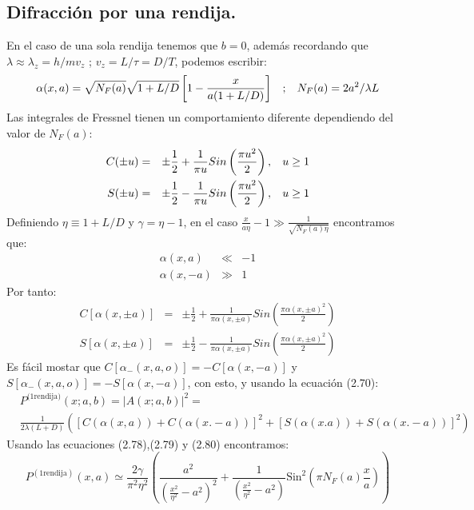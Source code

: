 \subsection{Difracción por una rendija.}
En el caso de una sola rendija tenemos que $b=0$, además recordando que $\lambda\approx\lambda_z=h/mv_z$ ; $v_z=L/\tau=D/T$, podemos escribir:
\begin{equation}
\alpha(x,a)=\sqrt{N_F(a)}\sqrt{1+L/D}\left[	1-\frac{x}{a(1+L/D)}\right] \hspace{0.3cm};\hspace{0.3cm} N_F(a)=2a^2/\lambda L
\end{equation}
Las integrales de Fressnel tienen un comportamiento diferente dependiendo del valor de $N_F(a)$:
\begin{eqnarray}
C(\pm u)&=&\pm\frac{1}{2}+\frac{1}{\pi u}Sin\left(\frac{\pi u^2}{2}\right),\hspace{0.3cm}u\geq 1\\
S(\pm u)&=&\pm\frac{1}{2}-\frac{1}{\pi u}Sin\left(\frac{\pi u^2}{2}\right),\hspace{0.3cm}u\geq 1
\end{eqnarray}
Definiendo $\eta\equiv 1+L/D$ y $\gamma=\eta-1$, en el caso $\frac{x}{a\eta}-1\gg\frac{1}{\sqrt{N_F(a)\eta}}$ encontramos que:
\begin{eqnarray}
\alpha(x,a)&\ll&-1\\
\alpha(x,-a)&\gg&1
\end{eqnarray} 
Por tanto:
\begin{eqnarray}
C[\alpha(x,\pm a)]&=&\pm\frac{1}{2}+\frac{1}{\pi\alpha(x,\pm a) }Sin\left(\frac{\pi \alpha(x,\pm a)^2}{2}\right)\\
S[\alpha(x,\pm a)]&=&\pm\frac{1}{2}-\frac{1}{\pi\alpha(x,\pm a) }Sin\left(\frac{\pi \alpha(x,\pm a)^2}{2}\right)
\end{eqnarray}
Es fácil mostar que $C[\alpha_-(x,a,o)]=-C[\alpha(x,-a)]$ y $S[\alpha_-(x,a,o)]=-S[\alpha(x,-a)]$, con esto, y usando la ecuación (2.70):
\begin{eqnarray}
\nonumber & P^{\text{(1rendija)}}(x;a,b)=|A(x;a,b)|^2=\\&\frac{1}{2\lambda(L+D)}
([C(\alpha(x,a))+C(\alpha(x.-a))]^{2}+[S(\alpha(x.a))+S(\alpha(x.-a))]^{2})
\end{eqnarray}
Usando las ecuaciones (2.78),(2.79) y (2.80) encontramos:
\begin{equation}
P^{(\text{1rendija})}(x,a)\simeq\frac{2\gamma}{\pi^{2}\eta^{2}}\left(\frac{a^{2}}{\left(\frac{x^{2}}{\eta^{2}}-a^{2}\right)^{2}}+\frac{1}{\left(\frac{x^{2}}{\eta^{2}}-a^{2}\right)}\text{Sin}^{2}\left(\pi N_{F}(a)\frac{x}{a}\right)\right)
\end{equation}
